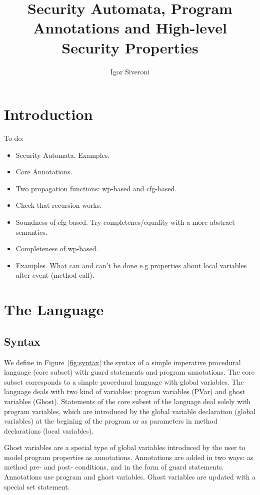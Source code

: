 \documentclass[10pt,notitlepage,twoside]{article}
\title{Security Automata, Program Annotations and High-level Security Properties}
\author{Igor Siveroni}
\date{}
\begin{document}
\maketitle

\section{Introduction}

To do:
\begin{itemize}
\item Security Automata. Examples.
\item Core Annotations.
\item Two propagation functions: wp-based and cfg-based.
\item Check that recursion works.
\item Soundness of cfg-based. Try completenes/equality with a more abstract semantics.
\item Completeness of wp-based.
\item Examples. What can and can't be done e.g properties about local variables after event (method call).
\end{itemize}

\section{The Language}

\subsection{Syntax}

We define in Figure~\ref{fig:syntax} the syntax of a simple imperative procedural language (core subset) with guard statements and program annotations.
The core subset corresponds to a simple procedural language with global variables.
The language deals with two kind of variables: program variables (\textrm{PVar}) and ghost variables (\textrm{Ghost}).
Statements of the core subset of the language deal solely with program variables, which are introduced by the global variable declaration (global variables) at the begining of the program or as parameters in method declarations (local variables).

Ghost variables are a special type of global variables introduced by the user to model program properties as annotations.
Annotations are added in two ways: as method  pre- and post- conditions, and in the form of guard statements.
Annotations use program and ghost variables. Ghost variables are updated with a special set statement.
\end{document}
